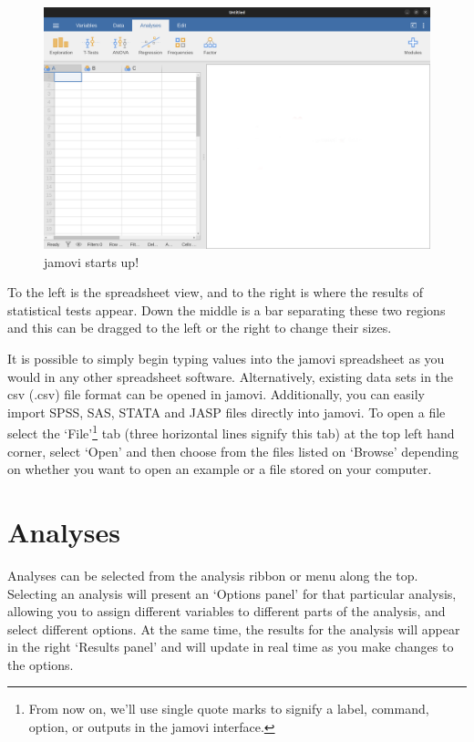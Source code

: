 \documentclass[
  a4paper,
]{book}
\begin{document}
\begin{figure}

\includegraphics[width=1\textwidth,height=\textheight]{images/fig3-1.png} \hfill{}

\caption{\label{fig-fig3-1}jamovi starts up!}

\end{figure}

To the left is the spreadsheet view, and to the right is where the
results of statistical tests appear. Down the middle is a bar separating
these two regions and this can be dragged to the left or the right to
change their sizes.

It is possible to simply begin typing values into the jamovi spreadsheet
as you would in any other spreadsheet software. Alternatively, existing
data sets in the csv (.csv) file format can be opened in jamovi.
Additionally, you can easily import SPSS, SAS, STATA and JASP files
directly into jamovi. To open a file select the `File'\footnote{From now
  on, we'll use single quote marks to signify a label, command, option,
  or outputs in the jamovi interface.} tab (three horizontal lines
signify this tab) at the top left hand corner, select `Open' and then
choose from the files listed on `Browse' depending on whether you want
to open an example or a file stored on your computer.

\hypertarget{analyses}{%
\section{Analyses}\label{analyses}}

Analyses can be selected from the analysis ribbon or menu along the top.
Selecting an analysis will present an `Options panel' for that
particular analysis, allowing you to assign different variables to
different parts of the analysis, and select different options. At the
same time, the results for the analysis will appear in the right
`Results panel' and will update in real time as you make changes to the
options.
\end{document}
